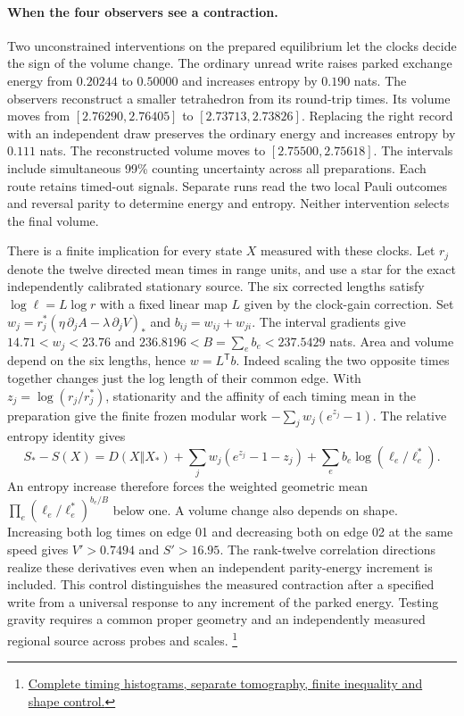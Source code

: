 \documentclass[11pt]{article}
\begin{document}
\paragraph{When the four observers see a contraction.}
Two unconstrained interventions on the prepared equilibrium let the
clocks decide the sign of the volume change. The ordinary unread write
raises parked exchange energy from $0.20244$ to $0.50000$ and increases
entropy by $0.190$ nats. The observers reconstruct a smaller
tetrahedron from its round-trip times. Its volume moves from
$[2.76290,2.76405]$ to $[2.73713,2.73826]$. Replacing the right record
with an independent draw preserves the ordinary energy and increases
entropy by $0.111$ nats. The reconstructed volume moves to
$[2.75500,2.75618]$. The intervals include simultaneous 99\% counting
uncertainty across all preparations. Each route retains timed-out
signals. Separate runs read the two local Pauli outcomes and reversal
parity to determine energy and entropy. Neither intervention selects
the final volume.

There is a finite implication for every state $X$ measured with these
clocks. Let $r_j$ denote the twelve directed mean times in range units,
and use a star for the exact independently calibrated stationary
source. The six corrected lengths satisfy $\log\ell=L\log r$ with a
fixed linear map $L$ given by the clock-gain correction. Set
$w_j=r_j^*(\eta\,\partial_jA-\lambda\,\partial_jV)_*$ and
$b_{ij}=w_{ij}+w_{ji}$. The interval gradients give
$14.71<w_j<23.76$ and $236.8196<B=\sum_e b_e<237.5429$ nats.
Area and volume depend on the six lengths, hence $w=L^{\mathsf T}b$.
Indeed scaling the two opposite times together changes just the log
length of their common edge. With $z_j=\log(r_j/r_j^*)$, stationarity
and the affinity of each timing mean in the preparation give the
finite frozen modular work $-\sum_jw_j(e^{z_j}-1)$.
The relative entropy identity gives
\[
 S_*-S(X)=D(X\Vert X_*)+\sum_jw_j(e^{z_j}-1-z_j)
          +\sum_e b_e\log(\ell_e/\ell_e^*).
\]
An entropy increase therefore forces the weighted geometric mean
$\prod_e(\ell_e/\ell_e^*)^{b_e/B}$ below one. A volume change also
depends on shape. Increasing both log times on edge 01 and decreasing
both on edge 02 at the same speed gives $V'>0.7494$ and $S'>16.95$.
The rank-twelve correlation directions realize these derivatives even
when an independent parity-energy increment is included. This control
distinguishes the measured contraction after a specified write from a
universal response to any increment of the parked energy. Testing
gravity requires a common proper geometry and an independently
measured regional source across probes and scales.%
\footnote{\href{https://github.com/FloatingPragma/observer-patch-holography/tree/main/code/matched_einstein_limit/source_implication/full_geometry/station_balls/reciprocal_screen/range_contraction}{Complete timing histograms, separate tomography, finite inequality and shape control.}}
\end{document}
